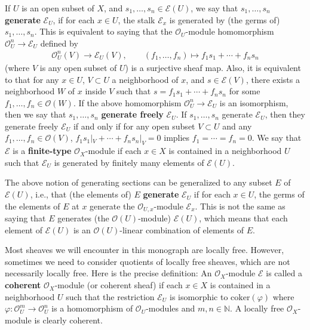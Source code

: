 \documentclass[12pt,b5paper,notitlepage]{report}
\theoremstyle{definition}
\theoremstyle{plain}
\newcommand{\scr}{\mathscr}
\newcommand{\coker}{\mathrm{coker}}
\newcommand{\Nbb}{\mathbb N}
\numberwithin{equation}{section}
\begin{document}
If $U$ is an open subset of $X$, and $s_1,\dots,s_n\in\scr E(U)$, we say that $s_1,\dots,s_n$ \textbf{generate} $\scr E_U$, if for each $x\in U$, the stalk $\scr E_x$ is generated by (the germs of) $s_1,\dots, s_n$. This is equivalent to saying that the $\scr O_U$-module homomorphism $\scr O_U^n\rightarrow\scr E_U$ defined by 
\begin{align*}
\scr O_U^n(V)\rightarrow\scr E_U(V),\qquad (f_1,\dots,f_n)\mapsto f_1s_1+\cdots+f_ns_n
\end{align*}
(where $V$ is any open subset of $U$) is a surjective sheaf map. Also, it is equivalent to that for any $x\in U$, $V\subset U$ a neighborhood of $x$, and $s\in\scr E(V)$, there exists a neighborhood $W$ of $x$ inside $V$ such that $s=f_1s_1+\cdots+f_ns_n$ for some $f_1,\dots,f_n\in\scr O(W)$.  If the above homomorphism $\scr O^n_U\rightarrow\scr E_U$ is an isomorphism, then we say that $s_1,\dots,s_n$ \textbf{generate freely} $\scr E_U$. If $s_1,\dots,s_n$ generate $\scr E_U$, then they generate freely $\scr E_U$ if and only if for any open subset $V\subset U$ and any $f_1,\dots,f_n\in\scr O(V)$, $f_1s_1|_V+\cdots+f_ns_n|_V=0$ implies $f_1=\cdots=f_n=0$.  We say that $\scr E$ is a \textbf{finite-type} $\scr O_X$-module if each $x\in X$ is contained in a neighborhood $U$ such that $\scr E_U$ is generated by finitely many elements of $\scr E(U)$.

The above notion of generating sections can be generalized to any subset $E$ of $\scr E(U)$, i.e., that (the elements of) $E$ \textbf{generate} $\scr E_U$ if for each $x\in U$, the germs of the elements of $E$ at $x$ generate the $\scr O_{U,x}$-module $\scr E_x$. This is not the same as saying that $E$ generates (the $\scr O(U)$-module) $\scr E(U)$, which means that each element of $\scr E(U)$ is an $\scr O(U)$-linear combination of elements of $E$.



Most sheaves  we will encounter in this monograph are locally free. However, sometimes we need to consider quotients of locally free sheaves, which are not necessarily locally free. Here is the precise definition:  An $\scr O_X$-module $\scr E$ is called a \textbf{coherent}  $\scr O_X$-module (or coherent sheaf) if  each $x\in X$ is contained in a neighborhood $U$ such that the restriction $\scr E_U$ is isomorphic to $\coker(\varphi)$ where $\varphi:\scr O_U^m\rightarrow\scr O_U^n$ is a homomorphism of $\scr O_U$-modules and $m,n\in\Nbb$. A locally free $\scr O_X$-module is clearly coherent.
\end{document}
